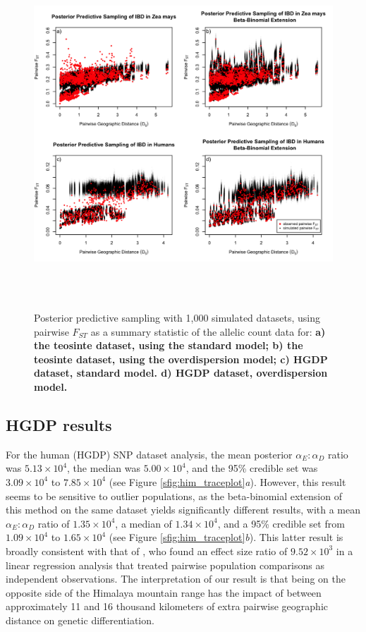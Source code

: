 \begin{figure}[ht!]
\begin{center}
  \includegraphics[width=6in,height=5.14in]{figs/bedassle/fig_3.png}
 \caption{
 		\textmd{Posterior predictive sampling with 1,000 simulated datasets, using pairwise $F_{ST}$ as a summary statistic of the allelic count data for:}
	\bf{a)}
 		\textmd{the teosinte dataset, using the standard model;}
	\bf{b)}
 		\textmd{the teosinte dataset, using the overdispersion model;}
	\bf{c)}
 		\textmd{HGDP dataset, standard model.}
	\bf{d)}
 		\textmd{HGDP dataset, overdispersion model.}
 \label{sfig:pps}
  }
\end{center}
\end{figure}
	
\subsection*{HGDP results}  
For the human (HGDP) SNP dataset analysis, the mean posterior $\alpha_{E} : \alpha_{D}$ ratio was $5.13 \times 10^{4}$, the median was $5.00 \times10^{4}$, and the 95\% credible set was $3.09 \times10^{4}$ to $7.85\times10^{4}$ (see Figure \ref{sfig:him_traceplot}\textit{a}). However, this result seems to be sensitive to outlier populations, as the beta-binomial extension of this method on the same dataset yields significantly different results, with a mean $\alpha_{E} : \alpha_{D}$ ratio of $1.35\times10^{4}$, a median of $1.34\times10^{4}$, and a 95\% credible set from $1.09\times10^{4}$ to $1.65\times10^{4}$ (see Figure \ref{sfig:him_traceplot}\textit{b}). 
This latter result is broadly consistent with that of \citet{Rosenberg2011}, who found an effect size ratio of $9.52\times10^{3}$ in a linear regression analysis that treated pairwise population comparisons as independent observations. The interpretation of our result is that being on the opposite side of the Himalaya mountain range has the impact of between approximately 11 and 16 thousand kilometers of extra pairwise geographic distance on  genetic differentiation. 

